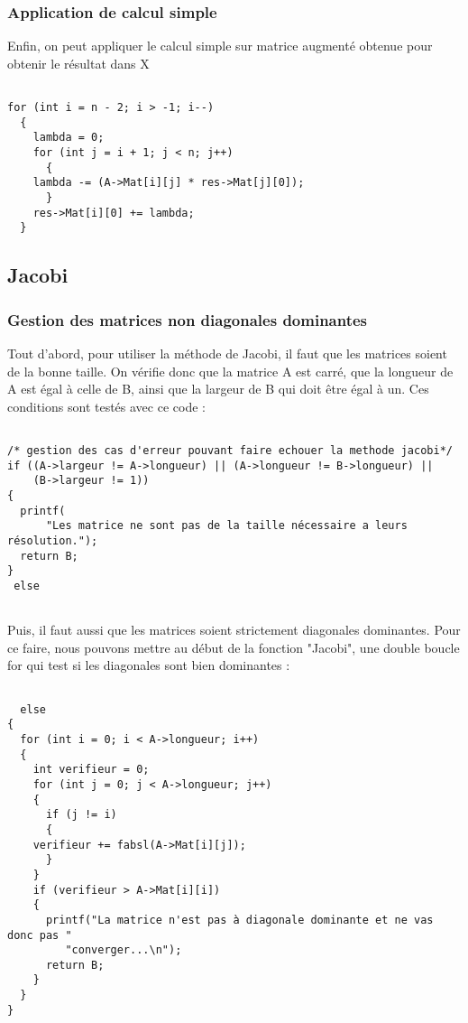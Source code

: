\documentclass[letter]{article}
\begin{document}
\subsubsection{Application de calcul simple}
\label{sec:org225c67c}
Enfin, on peut appliquer le calcul simple sur matrice augmenté obtenue pour obtenir le résultat dans X

\begin{verbatim}

for (int i = n - 2; i > -1; i--)
  {
    lambda = 0;
    for (int j = i + 1; j < n; j++)
      {
	lambda -= (A->Mat[i][j] * res->Mat[j][0]);
      }
    res->Mat[i][0] += lambda;
  }

\end{verbatim}


\subsection{Jacobi}
\label{sec:org62ec26d}

\subsubsection{Gestion des matrices non diagonales dominantes}
\label{sec:org37cb1fd}


Tout d'abord, pour utiliser la méthode de Jacobi, il faut que les matrices soient de la bonne taille. On vérifie donc que la matrice A est carré, que la longueur de A est égal à celle de B, ainsi que la largeur de B qui doit être égal à un. Ces conditions sont testés avec ce code :
\begin{verbatim}

/* gestion des cas d'erreur pouvant faire echouer la methode jacobi*/
if ((A->largeur != A->longueur) || (A->longueur != B->longueur) ||
    (B->largeur != 1))
{
  printf(
      "Les matrice ne sont pas de la taille nécessaire a leurs résolution.");
  return B;
}
 else


\end{verbatim}



Puis, il faut aussi que les matrices soient strictement diagonales dominantes.
Pour ce faire, nous pouvons mettre au début de la fonction "Jacobi", une double boucle for qui test si les diagonales sont bien dominantes :

\begin{verbatim}

  else
{
  for (int i = 0; i < A->longueur; i++)
  {
    int verifieur = 0;
    for (int j = 0; j < A->longueur; j++)
    {
      if (j != i)
      {
	verifieur += fabsl(A->Mat[i][j]);
      }
    }
    if (verifieur > A->Mat[i][i])
    {
      printf("La matrice n'est pas à diagonale dominante et ne vas donc pas "
	     "converger...\n");
      return B;
    }
  }
}


\end{verbatim}
\end{document}
